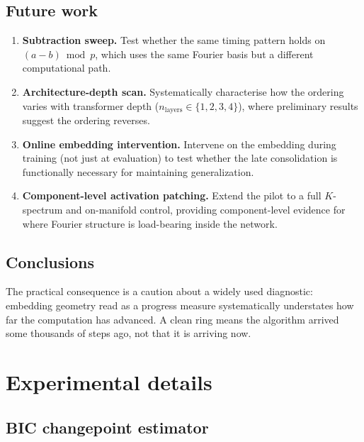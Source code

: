 \documentclass[12pt,openany,a4paper]{book}
\begin{document}
\section{Future work}

\begin{enumerate}
  \item \textbf{Subtraction sweep.} Test whether the same timing pattern holds on $(a-b) \bmod p$, which uses the same Fourier basis but a different computational path.
  \item \textbf{Architecture-depth scan.} Systematically characterise how the ordering varies with transformer depth ($n_{\mathrm{layers}} \in \{1,2,3,4\}$), where preliminary results suggest the ordering reverses.
  \item \textbf{Online embedding intervention.} Intervene on the embedding during training (not just at evaluation) to test whether the late consolidation is functionally necessary for maintaining generalization.
  \item \textbf{Component-level activation patching.} Extend the pilot to a full $K$-spectrum and on-manifold control, providing component-level evidence for where Fourier structure is load-bearing inside the network.
\end{enumerate}

\section{Conclusions}

The practical consequence is a caution about a widely used diagnostic: embedding geometry read as a progress measure systematically understates how far the computation has advanced. A clean ring means the algorithm arrived some thousands of steps ago, not that it is arriving now.


\cleardoublepage




\appendix

\newpage
{}
\mbox{}
\newpage

\chapter{Experimental details}

\section{BIC changepoint estimator}
\end{document}
